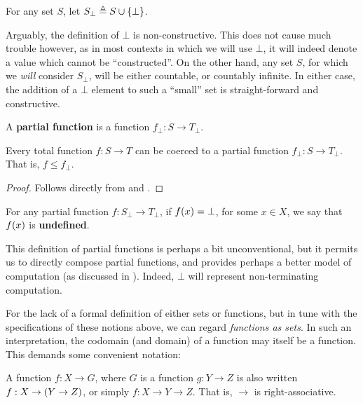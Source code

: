 \begin{definition} For any set $S$, let $S_\bot\triangleq S\cup \mathopen{}\left\{{\bot}\right\}\mathclose{}$.
\end{definition}

Arguably, the definition of $\bot$ is non-constructive. This does not cause
much trouble however, as in most contexts in which we will use $\bot$, it will
indeed denote a value which cannot be ``constructed''. On the other hand, any
set $S$, for which we \emph{will} consider $S_\bot$, will be either countable,
or countably infinite. In either case, the addition of a $\bot$ element to such
a ``small'' set is straight-forward and constructive.

\begin{definition} \label{def:partial-function} A \textbf{partial function} is
a function $f_\bot:S\rightarrow T_\bot$. \end{definition}

\begin{theorem} Every total function $f : S\rightarrow T$ can be coerced to a
partial function $f_\bot : S \rightarrow T_\bot$. That is, $f \leq f_\bot$.
\end{theorem}

\begin{proof} Follows directly from  and
. \end{proof}

\begin{definition} For any partial function $f:S_\bot\rightarrow T_\bot$, if
$f\mathopen{}\left({x}\right)\mathclose{}=\bot$, for some $x\in X$, we say that $f\mathopen{}\left({x}\right)\mathclose{}$ is
\textbf{undefined}.\end{definition}

This definition of partial functions is perhaps a bit unconventional, but it
permits us to directly compose partial functions, and provides perhaps a better
model of computation (as discussed in
). Indeed, $\bot$ will represent
non-terminating computation.

For the lack of a formal definition of either sets or functions, but in tune
with the specifications of these notions above, we can regard \emph{functions
as sets}. In such an interpretation, the codomain (and domain) of a function
may itself be a function. This demands some convenient notation:

\begin{notation} A function $f:X\rightarrow G$, where $G$ is a function
$g:Y\rightarrow Z$ is also written $f:X\rightarrow \mathopen{}\left({Y\rightarrow Z}\right)\mathclose{}$, or
simply $f:X\rightarrow Y\rightarrow Z$. That is, $\rightarrow$ is
right-associative. \end{notation}

